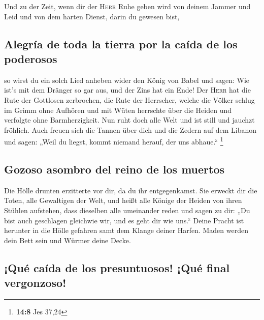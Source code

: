  Und zu der Zeit, wenn dir der \textsc{Herr} Ruhe geben
wird von deinem Jammer und Leid und von dem harten Dienst, darin du
gewesen bist,

\hypertarget{alegruxeda-de-toda-la-tierra-por-la-cauxedda-de-los-poderosos}{%
\subsection{Alegría de toda la tierra por la caída de los
poderosos}\label{alegruxeda-de-toda-la-tierra-por-la-cauxedda-de-los-poderosos}}

 so wirst du ein solch Lied anheben wider den König von
Babel und sagen: Wie ist's mit dem Dränger so gar aus, und der Zins hat
ein Ende!  Der \textsc{Herr} hat die Rute der Gottlosen
zerbrochen, die Rute der Herrscher,  welche die Völker
schlug im Grimm ohne Aufhören und mit Wüten herrschte über die Heiden
und verfolgte ohne Barmherzigkeit.  Nun ruht doch alle
Welt und ist still und jauchzt fröhlich.  Auch freuen sich
die Tannen über dich und die Zedern auf dem Libanon und sagen: „Weil du
liegst, kommt niemand herauf, der uns abhaue.`` \footnote{\textbf{14:8}
  Jes 37,24}

\hypertarget{gozoso-asombro-del-reino-de-los-muertos}{%
\subsection{Gozoso asombro del reino de los
muertos}\label{gozoso-asombro-del-reino-de-los-muertos}}

 Die Hölle drunten erzitterte vor dir, da du ihr
entgegenkamst. Sie erweckt dir die Toten, alle Gewaltigen der Welt, und
heißt alle Könige der Heiden von ihren Stühlen aufstehen,
 dass dieselben alle umeinander reden und sagen zu dir:
„Du bist auch geschlagen gleichwie wir, und es geht dir wie uns.``
 Deine Pracht ist herunter in die Hölle gefahren samt dem
Klange deiner Harfen. Maden werden dein Bett sein und Würmer deine
Decke.

\hypertarget{quuxe9-cauxedda-de-los-presuntuosos-quuxe9-final-vergonzoso}{%
\subsection{¡Qué caída de los presuntuosos! ¡Qué final
vergonzoso!}\label{quuxe9-cauxedda-de-los-presuntuosos-quuxe9-final-vergonzoso}}

